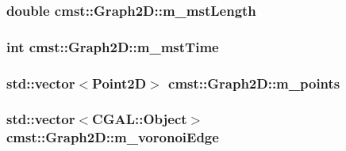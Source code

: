 \subsubsection[{\texorpdfstring{m\+\_\+mst\+Length}{m_mstLength}}]{\setlength{\rightskip}{0pt plus 5cm}double cmst\+::\+Graph2\+D\+::m\+\_\+mst\+Length\hspace{0.3cm}{\ttfamily [private]}}\hypertarget{classcmst_1_1_graph2_d_a722498b25b96d26e68e378ba970d5e65}{}\label{classcmst_1_1_graph2_d_a722498b25b96d26e68e378ba970d5e65}
\subsubsection[{\texorpdfstring{m\+\_\+mst\+Time}{m_mstTime}}]{\setlength{\rightskip}{0pt plus 5cm}int cmst\+::\+Graph2\+D\+::m\+\_\+mst\+Time\hspace{0.3cm}{\ttfamily [private]}}\hypertarget{classcmst_1_1_graph2_d_a447f3d36666c57d2f15bddc1e3126f1e}{}\label{classcmst_1_1_graph2_d_a447f3d36666c57d2f15bddc1e3126f1e}
\subsubsection[{\texorpdfstring{m\+\_\+points}{m_points}}]{\setlength{\rightskip}{0pt plus 5cm}std\+::vector$<${\bf Point2D}$>$ cmst\+::\+Graph2\+D\+::m\+\_\+points\hspace{0.3cm}{\ttfamily [protected]}}\hypertarget{classcmst_1_1_graph2_d_a32456f3c630e34a56ce3109183142c10}{}\label{classcmst_1_1_graph2_d_a32456f3c630e34a56ce3109183142c10}
\subsubsection[{\texorpdfstring{m\+\_\+voronoi\+Edge}{m_voronoiEdge}}]{\setlength{\rightskip}{0pt plus 5cm}std\+::vector$<$C\+G\+A\+L\+::\+Object$>$ cmst\+::\+Graph2\+D\+::m\+\_\+voronoi\+Edge\hspace{0.3cm}{\ttfamily [protected]}}\hypertarget{classcmst_1_1_graph2_d_a05e5ea6746bfd9d0ccd47308f4bbf1af}{}\label{classcmst_1_1_graph2_d_a05e5ea6746bfd9d0ccd47308f4bbf1af}
